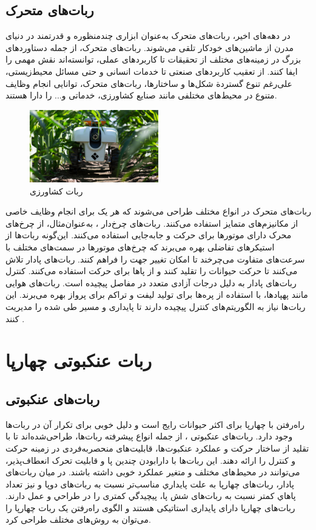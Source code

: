 \subsection{ربات‌های متحرک}
در دهه‌های اخیر، ربات‌های متحرک
\noindent\unskip{}
به‌عنوان ابزاری چندمنظوره و قدرتمند در دنیای مدرن از ماشین‌های خودکار تلقی می‌شوند. ربات‌های متحرک، از جمله دستاوردهای بزرگ در زمینه‌های مختلف از تحقیقات تا کاربردهای عملی، توانسته‌اند نقش مهمی را ایفا کنند. از تعقیب کاربردهای صنعتی تا خدمات انسانی و حتی مسائل محیط‌زیستی، علی‌رغم تنوع گستردة شکل‌ها و ساختارها، ربات‌های متحرک، توانایی انجام وظایف متنوع در محیط‌های مختلفی مانند صنایع کشاورزی، خدماتی و... را دارا هستند.
\begin{figure}[h]
	\centering
	\includegraphics[width=0.5\textwidth]{./images/Chapter1/AgRobot}	
	\caption[ربات کشاورزی]{ربات کشاورزی \cite{AgRobot}}
	\label{ربات کشاورزی}
\end{figure}
\noindent
\unskip

ربات‌های متحرک در انواع مختلف طراحی می‌شوند که هر یک برای انجام وظایف خاصی از مکانیزم‌های متمایز استفاده می‌کنند. ربات‌های چرخ‌دار
\noindent\unskip{}
، به‌عنوان‌مثال، از چرخ‌های محرک دارای موتورها برای حرکت و جابه‌جایی استفاده می‌کنند. این‌گونه ربات‌ها از استیکرهای تفاضلی بهره می‌برند که چرخ‌های موتورها در سمت‌های مختلف با سرعت‌های متفاوت می‌چرخند تا امکان تغییر جهت را فراهم کنند. 
ربات‌های پادار
\noindent\unskip{}
تلاش می‌کنند تا حرکت حیوانات را تقلید کنند و از پاها برای حرکت استفاده می‌کنند. کنترل ربات‌های پادار به دلیل درجات آزادی متعدد در مفاصل پیچیده است. ربات‌های هوایی مانند پهپادها، با استفاده از پره‌ها برای تولید لیفت و تراکم برای پرواز بهره می‌برند. این ربات‌ها نیاز به الگوریتم‌های کنترل پیچیده دارند تا پایداری و مسیر طی شده را مدیریت کنند
\cite{Craig}
.
\section{ربات عنکبوتی چهارپا}
\subsection{ربات‌های عنکبوتی}
راه‌رفتن با چهارپا برای اکثر حیوانات رایج است و دلیل خوبی برای تکرار آن در ربات‌ها وجود دارد. ربات‌های عنکبوتی
\noindent\unskip{}
، از جمله انواع پیشرفته ربات‌ها، طراحی‌شده‌اند تا با تقلید از ساختار حرکت و عملکرد عنکبوت‌ها، قابلیت‌های منحصربه‌فردی در زمینه حرکت و کنترل را ارائه دهند. این ربات‌ها با دارابودن چندین پا و قابلیت تحرک انعطاف‌پذیر، می‌توانند در محیط‌های مختلف و متغیر عملکرد خوبی داشته باشند. در ميان ربات‌های پادار، ربات‌های چهارپا به علت پايداري مناسب‌تر نسبت به ربات‌های دو‌پا و نيز تعداد پاهاي كمتر نسبت به ربات‌های شش پا، پيچيدگي كمتری را در طراحي و عمل دارند. ربات‌های چهارپا دارای پایداری استاتیکی هستند و الگوی راه‌رفتن یک ربات چهارپا را می‌توان به روش‌های مختلف طراحی کرد.

